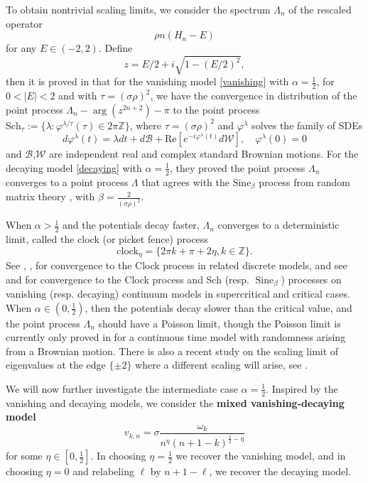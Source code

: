 \documentclass[12pt, reqno]{amsart}
\theoremstyle{definition}
\theoremstyle{remark}
\numberwithin{equation}{section}
\begin{document}
To obtain nontrivial scaling limits, we consider the spectrum $\Lambda_n$ of the rescaled operator
\begin{equation}
    \rho n(H_n-E)
\end{equation} for any $E\in(-2,2)$.
Define
$$z=E/2+i\sqrt{1-(E/2)^2},$$
then it is proved in \cite{kritchevski2011scaling} that for the vanishing model \eqref{vanishing} with $\alpha=\frac{1}{2}$, for $0<|E|<2$ and with $\tau=(\sigma\rho)^2$, we have the convergence in distribution of the point process $\Lambda_n-\arg(z^{2n+2})-\pi$ to the point process
$\text{Sch}_\tau:=\{\lambda:\varphi^{\lambda/\tau}(\tau)\in 2\pi\mathbb{Z}\}$,
where $\tau=(\sigma\rho)^2$ and $\varphi^{\lambda}$ solves the family of SDEs
\begin{equation}
    d\varphi^{\lambda}(t)=\lambda dt+d\mathcal{B}+\text{Re}[e^{-i\varphi^\lambda(t)}d\mathcal{W}],\quad\varphi^\lambda(0)=0
\end{equation}
and $\mathcal{B}$,$\mathcal{W}$ are independent real and complex standard Brownian motions. For the decaying model \eqref{decaying} with $\alpha=\frac{1}{2}$, they proved the point process $\Lambda_n$ converges to a point process $\Lambda$ that agrees with the $\text{Sine}_\beta$ process from random matrix theory \cite{valko2009continuum}, with $\beta=\frac{2}{(\sigma\rho)^2}$.


 When $\alpha>\frac{1}{2}$ and the potentials decay faster, $\Lambda_n$ converges to a deterministic limit, called the clock (or picket fence) process
$$\text{clock}_\eta=\{2\pi k+\pi +2\eta,k\in\mathbb{Z}\}.$$ See \cite{flores2023one}, \cite{killip2009eigenvalue}, \cite{last2008fine} for convergence to the Clock process in related discrete models, and see \cite{nakano2014level} and \cite{MR3379349} for convergence to the Clock process and Sch (resp. $\operatorname{Sine}_\beta$) processes on vanishing (resp. decaying) continuum models in supercritical and critical cases.
When $\alpha\in(0,\frac{1}{2})$, then the potentials decay slower than the critical value, and the point process $\Lambda_n$ should have a Poisson limit, though the Poisson limit is currently only proved in \cite{kotani2017poisson} for a continuous time model with randomness arising from a Brownian motion. There is also a recent study on the scaling limit of eigenvalues at the edge $\{\pm 2\}$ where a different scaling will arise, see \cite{han2023universal}.


We will now further investigate the intermediate case $\alpha=\frac{1}{2}$. Inspired by the vanishing and decaying models, we consider the \textbf{mixed vanishing-decaying model}  
\begin{equation}
    \label{mixedvanishingdecaying}
v_{k,n}=\sigma\frac{\omega_k}{n^\eta(n+1-k)^{\frac{1}{2}-\eta}}\end{equation}for some $\eta\in[0,\frac{1}{2}]$. In choosing $\eta=\frac{1}{2}$ we recover the vanishing model, and in choosing $\eta=0$ and relabeling $\ell$ by $n+1-\ell$, we recover the decaying model. 
\end{document}

